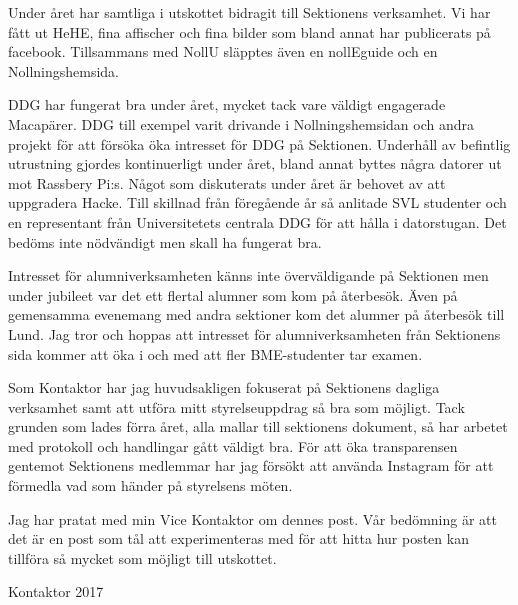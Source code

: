 \documentclass[../_main/handlingar.tex]{subfiles}
\begin{document}
Under året har samtliga i utskottet bidragit till Sektionens verksamhet. Vi har fått ut HeHE, fina affischer och fina bilder som bland annat har publicerats på facebook. Tillsammans med NollU släpptes även en nollEguide och en Nollningshemsida.

DDG har fungerat bra under året, mycket tack vare väldigt engagerade Macapärer. DDG till exempel varit drivande i Nollningshemsidan och andra projekt för att försöka öka intresset för DDG på Sektionen. Underhåll av befintlig utrustning gjordes kontinuerligt under året, bland annat byttes några datorer ut mot Rassbery Pi:s. Något som diskuterats under året är behovet av att uppgradera Hacke. Till skillnad från föregående år så anlitade SVL studenter och en representant från Universitetets centrala DDG för att hålla i datorstugan. Det bedöms inte nödvändigt men skall ha fungerat bra.

Intresset för alumniverksamheten känns inte överväldigande på Sektionen men under jubileet var det ett flertal alumner som kom på återbesök. Även på gemensamma evenemang med andra sektioner kom det alumner på återbesök till Lund. Jag tror och hoppas att intresset för alumniverksamheten från Sektionens sida kommer att öka i och med att fler BME-studenter tar examen.

Som Kontaktor har jag huvudsakligen fokuserat på Sektionens dagliga verksamhet samt att utföra mitt styrelseuppdrag så bra som möjligt. Tack grunden som lades förra året, alla mallar till sektionens dokument, så har arbetet med protokoll och handlingar gått väldigt bra. För att öka transparensen gentemot Sektionens medlemmar har jag försökt att använda Instagram för att förmedla vad som händer på styrelsens möten.

Jag har pratat med min Vice Kontaktor om dennes post. Vår bedömning är att det är en post som tål att experimenteras med för att hitta hur posten kan tillföra så mycket som möjligt till utskottet.

\begin{signatures}{1}
    \mvh
    \signature{Johan Karlberg}{Kontaktor 2017}
\end{signatures}
\end{document}
